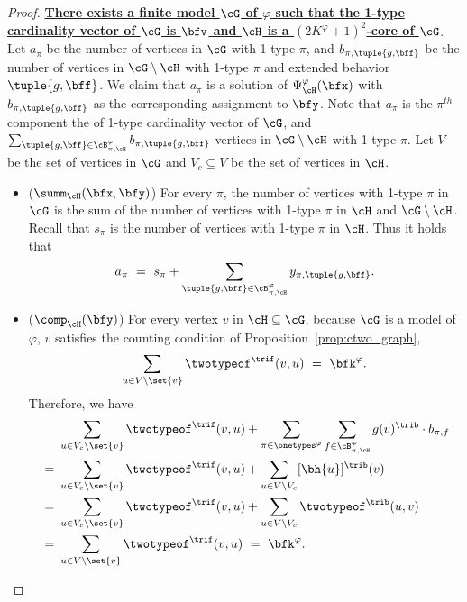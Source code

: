 \begin{proof}
    \textbf{\uline{There exists a finite model $\cG$ of $\varphi$ such that the 1-type cardinality vector of $\cG$ is $\bfv$ and $\cH$ is a $(2K^\varphi + 1)^2$-core of $\cG$}}.
    Let $a_{\pi}$ be the number of vertices in $\cG$ with 1-type $\pi$, and
    $b_{\pi, \tuple{g, \bff}}$ be the number of vertices in $\cG \setminus \cH$ with 1-type $\pi$ and extended behavior $\tuple{g, \bff}$.
    We claim that $a_\pi$ is a solution of $\Psi^\varphi_{\cH}(\bfx)$ with $b_{\pi, \tuple{g, \bff}}$ as the corresponding assignment to $\bfy$.
    Note that $a_\pi$ is the $\pi^{th}$ component the of 1-type cardinality vector of $\cG$,
    and
    $\sum_{\tuple{g, \bff} \in \cB^\varphi_{\pi, \cH}} b_{\pi, \tuple{g, \bff}}$ vertices in $\cG \setminus \cH$ with 1-type $\pi$.
    Let $V$ be the set of vertices in $\cG$ and $V_c \subseteq V$ be the set of vertices in $\cH$.
    \begin{itemize}
        \item ($\summ_{\cH}(\bfx, \bfy)$)
            For every $\pi$, the number of vertices with 1-type $\pi$ in $\cG$
            is the sum of the number of vertices with 1-type $\pi$ in $\cH$ and $\cG \setminus \cH$.
            Recall that $s_\pi$ is the number of vertices with 1-type $\pi$ in $\cH$.
            Thus it holds that
            \begin{equation*}
                a_\pi\ =\ s_\pi + \sum_{\tuple{g, \bff} \in \cB^\varphi_{\pi, \cH}} y_{\pi, \tuple{g, \bff}}.
            \end{equation*}

        \item ($\comp_{\cH}(\bfy)$)
        For every vertex $v$ in $\cH \subseteq \cG$,
        because $\cG$ is a model of $\varphi$, $v$ satisfies the counting condition of Proposition~\ref{prop:ctwo_graph},
        \begin{equation*}
            \sum_{u \in V \setminus \set{v}} \twotypeof^\trif(v, u)
                \ =\ 
            \bfk^\varphi.
        \end{equation*}
        Therefore, we have
        \begin{equation*}
            \begin{aligned}
                &
                \sum_{u \in V_c \setminus \set{v}} \twotypeof^\trif(v, u) +
                \sum_{\pi \in \onetypes^\varphi} \sum_{f \in \cB^\varphi_{\pi, \cH}} g(v)^\trib \cdot b_{\pi, f} \\
                \ =\ &
                \sum_{u \in V_c \setminus \set{v}} \twotypeof^\trif(v, u) +
                \sum_{u \in V \setminus V_c} [\bh{u}]^\trib(v) \\
                \ =\ &
                \sum_{u \in V_c \setminus \set{v}} \twotypeof^\trif(v, u) +
                \sum_{u \in V \setminus V_c} \twotypeof^\trib(u, v) \\
                \ =\ &
                \sum_{u \in V \setminus \set{v}} \twotypeof^\trif(v, u)
                \ =\ 
                \bfk^\varphi.
            \end{aligned}
        \end{equation*}


\end{itemize}
\end{proof}

